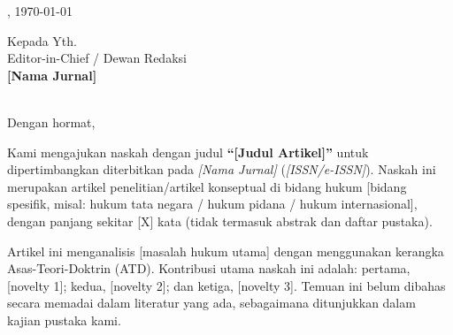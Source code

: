 \documentclass[12pt,a4paper]{article}
\begin{document}
\begin{flushright}
  [Kota], \today
\end{flushright}

\bigskip

Kepada Yth.\\
Editor-in-Chief / Dewan Redaksi\\
\textbf{[Nama Jurnal]}\\
[Institusi Penerbit]\\
[Alamat / URL Jurnal]

\bigskip

Dengan hormat,

\bigskip

Kami mengajukan naskah dengan judul \textbf{``[Judul Artikel]''} untuk dipertimbangkan
diterbitkan pada \textit{[Nama Jurnal]} (\textit{[ISSN/e-ISSN]}). Naskah ini
merupakan artikel penelitian/artikel konseptual
di bidang hukum [bidang spesifik, misal: hukum tata negara / hukum pidana / hukum internasional],
dengan panjang sekitar [X] kata (tidak termasuk abstrak dan daftar pustaka).

\bigskip

Artikel ini menganalisis [masalah hukum utama] dengan menggunakan kerangka Asas-Teori-Doktrin
(ATD). Kontribusi utama naskah ini adalah: pertama, [novelty 1]; kedua, [novelty 2]; dan
ketiga, [novelty 3]. Temuan ini belum dibahas secara memadai dalam literatur yang ada,
sebagaimana ditunjukkan dalam kajian pustaka kami.

\bigskip
\end{document}

